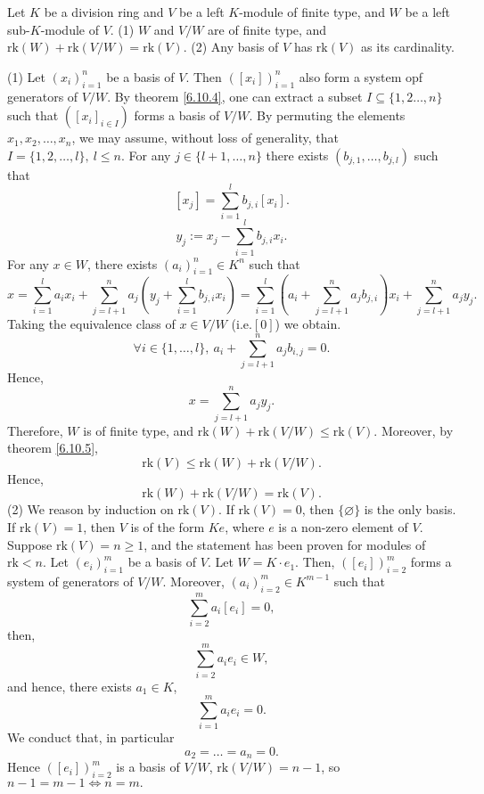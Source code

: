 \documentclass{book}
\numberwithin{equation}{section}
\begin{document}
\begin{theoremenv}
    Let $K$ be a division ring and $V$ be a left $K$-module of finite type, and $W$ be a left sub-$K$-module of $V$. 
    \newline
    (1) $W$ and $V/W$ are of finite type, and $\mathrm{rk}(W)+\mathrm{rk}(V/W)=\mathrm{rk}(V)$.
    \newline
    (2) Any basis of $V$ has $\mathrm{rk}(V)$ as its cardinality.
\end{theoremenv}
\begin{proofenv}
    \quad\newline
    (1) Let $\left(x_i\right)_{i=1}^n$ be a basis of $V$. Then $\left([x_i]\right)_{i=1}^n$ also form a system opf generators of $V/W$. By theorem \ref{6.10.4}, one can extract a subset $I\subseteq\{1,2\dots,n\}$ such that $\left([x_i]_{i\in I}\right)$ forms a basis of $V/W$. By permuting the elements $x_1,x_2,\dots, x_n$, we may assume, without loss of generality, that $I=\{1,2,\dots,l\},\ l\le n$. For any $j\in\{l+1,\dots, n\}$ there exists $(b_{j,1},\dots,b_{j,l})$ such that 
     $$[x_j]=\sum_{i=1}^{l}b_{j,i}[x_{i}].$$
     $$y_j:=x_j-\sum_{i=1}^{l}b_{j,i}x_i.$$
     For any $x\in W$, there exists $\left(a_i\right)_{i=1}^n\in K^n$ such that 
     $$x=\sum_{i=1}^{l}a_ix_i+\sum_{j=l+1}^{n}a_j\left(y_j+\sum_{i=1}^{l}b_{j,i}x_i\right)=\sum_{i=1}^{l}\left(a_i+\sum_{j=l+1}^{n}a_jb_{j,i}\right)x_i+\sum_{j=l+1}^{n}a_jy_j.$$
     Taking the equivalence class of $x\in V/W$ (i.e.$[0]$) we obtain. 
     $$\forall i\in \{1,\dots,l\},\ a_i+\sum_{j=l+1}^{n}a_jb_{i,j}=0.$$
     Hence, 
     $$x=\sum_{j=l+1}^{n}a_jy_j.$$
     Therefore, $W$ is of finite type, and $\mathrm{rk}(W)+\mathrm{rk}(V/W)\le \mathrm{rk}(V)$. Moreover, by theorem \ref{6.10.5},
     $$\mathrm{rk}(V)\le\mathrm{rk}(W)+\mathrm{rk}(V/W).$$
     Hence, $$\mathrm{rk}(W)+\mathrm{rk}(V/W)=\mathrm{rk}(V).$$
     (2) We reason by induction on $\mathrm{rk}(V)$. If $\mathrm{rk}(V)=0$, then $\{\varnothing\}$ is the only basis. If $\mathrm{rk}(V)=1$, then $V$ is of the form $Ke$, where $e$ is a non-zero element of $V$. Suppose $\mathrm{rk}(V)=n\ge 1$, and the statement has been proven for modules of $\mathrm{rk}<n$. Let $\left(e_i\right)_{i=1}^m$ be a basis of $V$. Let $W=K\cdot e_1$. Then, $\left([e_i]\right)_{i=2}^m$ forms a system of generators of $V/W$. Moreover, $\left(a_i\right)_{i=2}^m\in K^{m-1}$ such that 
     $$\sum_{i=2}^{m}a_i[e_i]=0,$$
     then,
     $$\sum_{i=2}^{m}a_ie_i\in W,$$
     and hence, there exists $a_1\in K$,
     $$\sum_{i=1}^{m}a_ie_i=0.$$
     We conduct that, in particular
     $$a_2=\dots=a_n=0.$$
     Hence $\left([e_i]\right)_{i=2}^m$ is a basis of $V/W$, $\mathrm{rk}(V/W)=n-1$, so $n-1=m-1\Leftrightarrow n=m.$
\end{proofenv}
\end{document}
